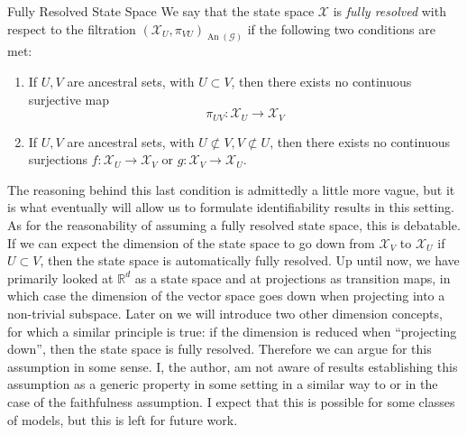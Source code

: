 \documentclass[11pt, a4paper]{memoir}
\theoremstyle{break}
\theoremstyle{break}
\theoremstyle{nonumberplain}
\newcommand{\mR}{\mathbb{R}}
\DeclareMathOperator{\an}{An}
\begin{document}
\begin{mydefinition}{Fully Resolved State Space}
We say that the state space $\mathcal{X}$ is \emph{fully resolved} with respect to the filtration $(\mathcal{X}_U,\pi_{VU})_{\an(\mathcal{G})}$ if the following two conditions are met:
\begin{enumerate}[label=\roman*)]
	\item If $U,V$ are ancestral sets, with $U\subset V$, then there exists no continuous surjective map
	$$\pi_{UV}:\mathcal{X}_{U}\to \mathcal{X}_V$$
	\item If $U,V$ are ancestral sets, with $U\not\subset V, V\not\subset U$, then there exists no continuous surjections
	$f:\mathcal{X}_U\to \mathcal{X}_V$ or $g:\mathcal{X}_V\to \mathcal{X}_U$.
\end{enumerate}
\end{mydefinition}
The reasoning behind this last condition is admittedly a little more vague, but it is what eventually will allow us to formulate identifiability results in this setting. As for the reasonability of assuming a fully resolved state space, this is debatable. If we can expect the dimension of the state space to go down from $\mathcal{X}_V$ to $\mathcal{X}_U$ if $U\subset V$, then the state space is automatically fully resolved. Up until now, we have primarily looked at $\mR^d$ as a state space and at projections as transition maps, in which case the dimension of the vector space goes down when projecting into a non-trivial subspace. Later on we will introduce two other dimension concepts, for which a similar principle is true: if the dimension is reduced when \enquote{projecting down}, then the state space is fully resolved. Therefore we can argue for this assumption in some sense. I, the author, am not aware of results establishing this assumption as a generic property in some setting in a similar way to \cite{Faithful1} or \cite{Spirtes} in the case of the faithfulness assumption. I expect that this is possible for some classes of models, but this is left for future work.\\\\
\end{document}
